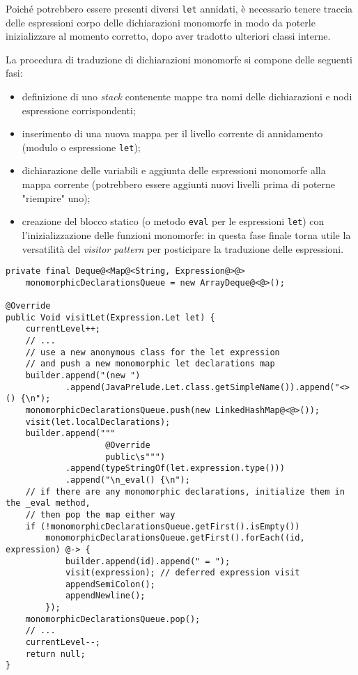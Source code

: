 \newpage

\noindent Poiché potrebbero essere presenti diversi \texttt{let} annidati, è necessario tenere traccia delle espressioni
corpo delle dichiarazioni monomorfe in modo da poterle inizializzare al momento corretto, dopo aver tradotto ulteriori classi interne.

\noindent La procedura di traduzione di dichiarazioni monomorfe si compone delle seguenti fasi:
\begin{itemize}
    \item definizione di uno \textit{stack} contenente mappe tra nomi delle dichiarazioni e nodi espressione corrispondenti;
    \item inserimento di una nuova mappa per il livello corrente di annidamento (modulo o espressione \texttt{let});
    \item dichiarazione delle variabili e aggiunta delle espressioni monomorfe
          alla mappa corrente (potrebbero essere aggiunti nuovi livelli prima di poterne "riempire" uno);
    \item creazione del blocco statico (o metodo \texttt{eval} per le espressioni \texttt{let}) con l'inizializzazione
          delle funzioni monomorfe: in questa fase finale torna utile la versatilità del \textit{visitor pattern} per posticipare
          la traduzione delle espressioni.
\end{itemize}

\vspace{4mm}
\begin{lstlisting}[caption={Traduzione di funzioni monomorfe in \texttt{let}}, style=javaCode, label={lst:5-13-monomorphic-translation-java}]
private final Deque@<Map@<String, Expression@>@>
    monomorphicDeclarationsQueue = new ArrayDeque@<@>();

@Override
public Void visitLet(Expression.Let let) {
    currentLevel++;
    // ...
    // use a new anonymous class for the let expression
    // and push a new monomorphic let declarations map
    builder.append("(new ")
            .append(JavaPrelude.Let.class.getSimpleName()).append("<>() {\n");
    monomorphicDeclarationsQueue.push(new LinkedHashMap@<@>());
    visit(let.localDeclarations);
    builder.append("""
                    @Override
                    public\s""")
            .append(typeStringOf(let.expression.type()))
            .append("\n_eval() {\n");
    // if there are any monomorphic declarations, initialize them in the _eval method,
    // then pop the map either way
    if (!monomorphicDeclarationsQueue.getFirst().isEmpty())
        monomorphicDeclarationsQueue.getFirst().forEach((id, expression) @-> {
            builder.append(id).append(" = ");
            visit(expression); // deferred expression visit
            appendSemiColon();
            appendNewline();
        });
    monomorphicDeclarationsQueue.pop();
    // ...
    currentLevel--;
    return null;
}
\end{lstlisting}

